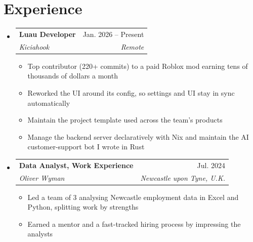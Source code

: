 \documentclass[a4paper,11pt]{article}
\makeatletter
\newcommand{\resumeItem}[1]{
  \item\small{
    {#1\vspace{-2pt}}%
  }%
}
\newcommand{\resumeSubheading}[4]{
  \vspace{-2pt}\item
    \begin{tabular*}{0.97\textwidth}[t]{l@{\extracolsep{\fill}}r}
      \textbf{#1} & #2 \\
      \textit{\small#3} & \textit{\small #4} \\
    \end{tabular*}\vspace{-7pt}
}
\newcommand{\resumeSubHeadingListStart}{\begin{itemize}[leftmargin=0.15in, label={}]}
\newcommand{\resumeSubHeadingListEnd}{\end{itemize}}
\newcommand{\resumeItemListStart}{\begin{itemize}}
\newcommand{\resumeItemListEnd}{\end{itemize}\vspace{-5pt}}
\makeatother
\begin{document}
\section{Experience}
  \resumeSubHeadingListStart

    \resumeSubheading
      {Luau Developer}{Jan. 2026 -- Present}
      {Kiciahook}{Remote}
      \resumeItemListStart
        \resumeItem{Top contributor (220+ commits) to a paid Roblox mod earning tens of thousands of dollars a month}
        \resumeItem{Reworked the UI around its config, so settings and UI stay in sync automatically}
        \resumeItem{Maintain the project template used across the team's products}
        \resumeItem{Manage the backend server declaratively with Nix and maintain the AI customer-support bot I wrote in Rust}
      \resumeItemListEnd

    \resumeSubheading
      {Data Analyst, Work Experience}{Jul. 2024}
      {Oliver Wyman}{Newcastle upon Tyne, U.K.}
      \resumeItemListStart
        \resumeItem{Led a team of 3 analysing Newcastle employment data in Excel and Python, splitting work by strengths}
        \resumeItem{Earned a mentor and a fast-tracked hiring process by impressing the analysts}
      \resumeItemListEnd

  \resumeSubHeadingListEnd


\end{document}
